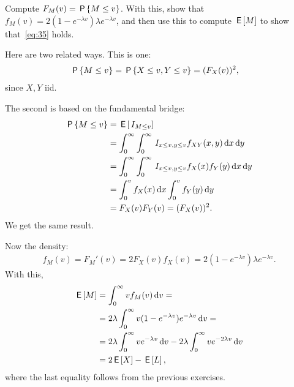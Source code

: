\documentclass[a4paper,11pt]{article}
\begin{document}
\begin{exercise}\label{ex:6}
Compute $F_M(v) = \P{M\leq v}$. With this, show that  $f_{M}(v)=2(1-e^{-\lambda v}) \lambda e^{-\lambda v}$,  and then use this to compute $\E M$ to show that~\cref{eq:35} holds.
\begin{solution}
Here are two related ways. This is one:
\begin{align}
\P{M\leq v}   &= \P{X \leq v, Y \leq v} = (F_{X}(v))^{2},
\end{align}
since $X, Y$ iid.  

The second is based on the fundamental bridge:
\begin{align}
\P{M\leq v}   
&= \E{\1{M\leq v}} \\ 
&=\int_0^{\infty} \int_0^{\infty} \1{x\leq v, y\leq v} f_{XY}(x,y) \d x \d y \\
&= \int_0^{\infty} \int_0^{\infty} \1{x\leq v, y\leq v} f_{X}(x) f_{Y}(y) \d x \d y \\
&= \int_0^{v} f_{X}(x) \d x \int_0^{v}  f_{Y}(y)  \d y \\
&= F_{X}(v) F_Y(v) = (F_X(v))^2.
\end{align}
We get the same result.

Now  the density:
\begin{align}
  \label{eq:26}
  f_M(v) = F_M'(v) = 2 F_X(v) f_X(v) = 2(1-e^{-\lambda v}) \lambda e^{- \lambda v}.
\end{align}
With this, 
\begin{align}
  \label{eq:27}
\E M 
&= \int_{0}^{\infty} v f_M(v) \d v = \\
&= 2 \lambda \int_{0}^{\infty} v (1-e^{-\lambda v}) e^{-\lambda v} \d v = \\
&= 2 \lambda \int_{0}^{\infty} v e^{-\lambda v} \d v -  2 \lambda \int_{0}^{\infty} v e^{-2 \lambda v} \d v \\
&= 2 \E X - \E L, 
\end{align}
where the last equality follows from the previous exercises. 
\end{solution}
\end{exercise}
\end{document}
